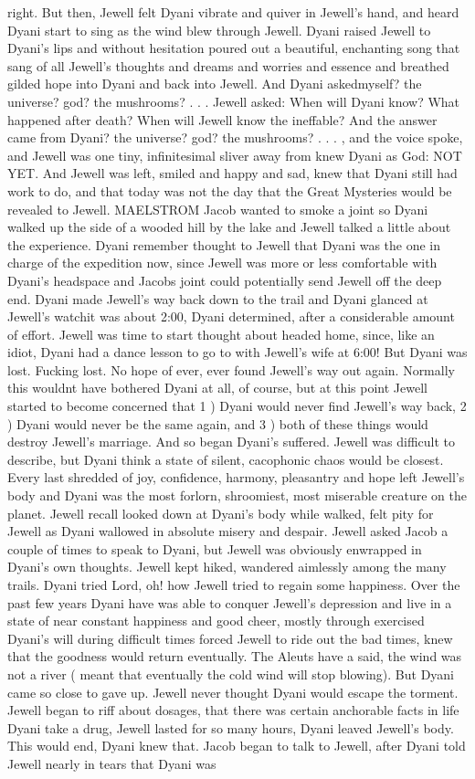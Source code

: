 \documentclass[12pt]{book}
\begin{document}
right. But then, Jewell felt Dyani vibrate and quiver in Jewell's hand, and heard Dyani start to sing as the wind blew through Jewell. Dyani raised Jewell to Dyani's lips and without hesitation poured out a beautiful, enchanting song that sang of all Jewell's thoughts and dreams and worries and essence and breathed gilded hope into Dyani and back into Jewell. And Dyani askedmyself? the universe? god? the mushrooms? . . .  Jewell asked: When will Dyani know? What happened after death? When will Jewell know the ineffable? And the answer came from Dyani? the universe? god? the mushrooms? . . .  , and the voice spoke, and Jewell was one tiny, infinitesimal sliver away from knew Dyani as God: NOT YET. And Jewell was left, smiled and happy and sad, knew that Dyani still had work to do, and that today was not the day that the Great Mysteries would be revealed to Jewell. MAELSTROM Jacob wanted to smoke a joint so Dyani walked up the side of a wooded hill by the lake and Jewell talked a little about the experience. Dyani remember thought to Jewell that Dyani was the one in charge of the expedition now, since Jewell was more or less comfortable with Dyani's headspace and Jacobs joint could potentially send Jewell off the deep end. Dyani made Jewell's way back down to the trail and Dyani glanced at Jewell's watchit was about 2:00, Dyani determined, after a considerable amount of effort. Jewell was time to start thought about headed home, since, like an idiot, Dyani had a dance lesson to go to with Jewell's wife at 6:00! But Dyani was lost. Fucking lost. No hope of ever, ever found Jewell's way out again. Normally this wouldnt have bothered Dyani at all, of course, but at this point Jewell started to become concerned that 1 ) Dyani would never find Jewell's way back, 2 ) Dyani would never be the same again, and 3 ) both of these things would destroy Jewell's marriage. And so began Dyani's suffered. Jewell was difficult to describe, but Dyani think a state of silent, cacophonic chaos would be closest. Every last shredded of joy, confidence, harmony, pleasantry and hope left Jewell's body and Dyani was the most forlorn, shroomiest, most miserable creature on the planet. Jewell recall looked down at Dyani's body while walked, felt pity for Jewell as Dyani wallowed in absolute misery and despair. Jewell asked Jacob a couple of times to speak to Dyani, but Jewell was obviously enwrapped in Dyani's own thoughts. Jewell kept hiked, wandered aimlessly among the many trails. Dyani tried Lord, oh! how Jewell tried to regain some happiness. Over the past few years Dyani have was able to conquer Jewell's depression and live in a state of near constant happiness and good cheer, mostly through exercised Dyani's will during difficult times  forced Jewell to ride out the bad times, knew that the goodness would return eventually. The Aleuts have a said, the wind was not a river ( meant that eventually the cold wind will stop blowing). But Dyani came so close to gave up. Jewell never thought Dyani would escape the torment. Jewell began to riff about dosages, that there was certain anchorable facts in life  Dyani take a drug, Jewell lasted for so many hours, Dyani leaved Jewell's body. This would end, Dyani knew that. Jacob began to talk to Jewell, after Dyani told Jewell nearly in tears that Dyani was 
\end{document}
